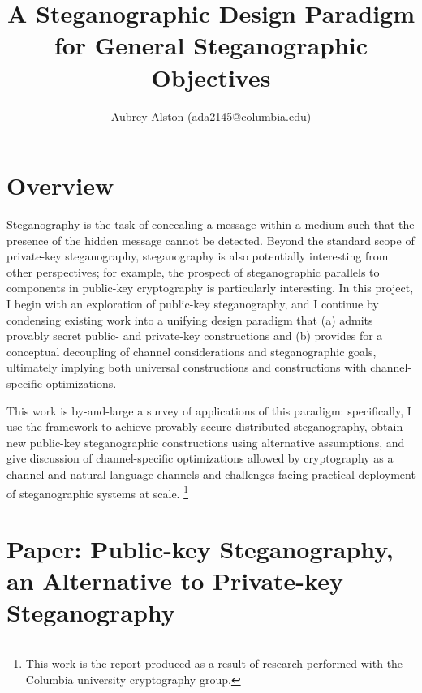 \documentclass{article}
\title{A Steganographic Design Paradigm for General Steganographic Objectives}
\author{Aubrey Alston (ada2145@columbia.edu)}
\date{}
\begin{document}
\maketitle

\section{Overview}

Steganography is the task of concealing a message within a medium such that the presence of the 
hidden message cannot be detected.  Beyond the standard scope of private-key steganography, steganography 
is also potentially interesting from other perspectives; for example, the prospect of steganographic parallels to 
components in public-key cryptography is particularly interesting.  In this project, 
I begin with an exploration of public-key steganography, 
and I continue by condensing existing work into a unifying design paradigm that (a) admits provably secret 
public- and private-key constructions and (b) provides for a conceptual decoupling of channel considerations 
and steganographic goals, ultimately implying both universal constructions and constructions with channel-specific optimizations.  

This work is by-and-large a survey of applications of this paradigm: 
specifically, I use the framework to achieve provably secure distributed steganography, obtain new public-key steganographic 
constructions using alternative assumptions, and give discussion of channel-specific optimizations allowed by 
cryptography as a channel and natural language channels and challenges facing practical deployment 
of steganographic systems at scale.  \footnote{This work is the report produced as a result of research performed with the Columbia university 
cryptography group.}

\tableofcontents

\section{Paper: Public-key Steganography, an Alternative to Private-key Steganography}
\end{document}
